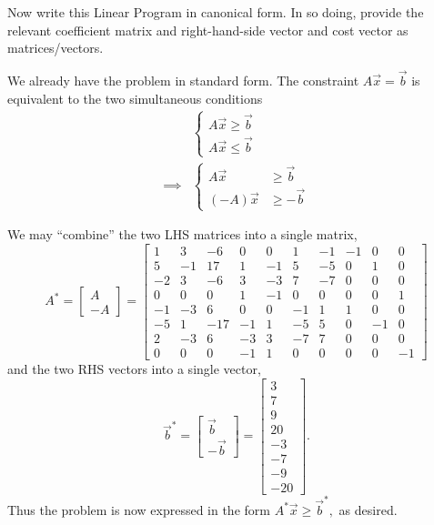 \documentclass{article}
\begin{document}
\begin{itemize}
\begin{enumerate}[a)]
			\ii Now write this Linear Program in canonical form. In so doing, provide the relevant coefficient matrix and right-hand-side vector and cost vector as matrices/vectors.
			\begin{soln}
				We already have the problem in standard form. The constraint $A\vec{x}=\vec{b}$ is equivalent to the two simultaneous conditions 
				\begin{align*}
					&\begin{cases}
						A\vec{x}\ge \vec{b} \\
						A\vec{x} \le \vec{b}
					\end{cases} \\
					\implies&\begin{cases}
						A\vec{x} &\ge \vec{b} \\
						(-A)\vec{x} &\ge -\vec{b}
					\end{cases}
				\end{align*}

				We may ``combine'' the two LHS matrices into a single matrix, 
				\[A^*=\begin{bmatrix}
					A \\ -A
				\end{bmatrix} = 
				\begin{bmatrix}
					1 & 3 & -6 & 0 & 0 & 1 & -1 & -1 & 0 & 0 \\
					5 & -1 & 17 & 1 & -1 & 5 & -5 & 0 & 1 & 0 \\
					-2 & 3 & -6 & 3 & -3 & 7 & -7 & 0 & 0 & 0 \\
					0 & 0 & 0 & 1 & -1 & 0 & 0 & 0 & 0 & 1 \\
					-1 & -3 & 6 & 0 & 0 & -1 & 1 & 1 & 0 & 0 \\
					-5 & 1 & -17 & -1 & 1 & -5 & 5 & 0 & -1 & 0 \\
					2 & -3 & 6 & -3 & 3 & -7 & 7 & 0 & 0 & 0 \\
					0 & 0 & 0 & -1 & 1 & 0 & 0 & 0 & 0 & -1
				\end{bmatrix}\] and the two RHS vectors into a single vector, 
				\[\vec{b}^*=\begin{bmatrix}
					\vec{b} \\ -\vec{b}
				\end{bmatrix} = 
				\begin{bmatrix}
					3 \\ 7 \\ 9 \\ 20 \\ -3 \\ -7 \\ -9 \\ -20
			\end{bmatrix}.\] Thus the problem is now expressed in the form $A^*\vec{x}\ge\vec{b}^*,$ as desired.
			\end{soln}
			

\end{enumerate}
\end{itemize}
\end{document}
